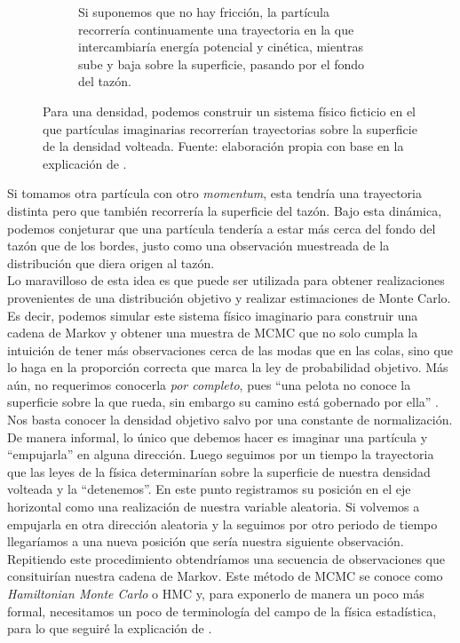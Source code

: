 \begin{figure}[h]
\begin{subfigure}{0.45\textwidth}
        \caption{Si suponemos que no hay fricción, la partícula recorrería continuamente una trayectoria en la que intercambiaría energía potencial y cinética, mientras sube y baja sobre la superficie, pasando por el fondo del tazón.}
        \label{fig:Part_Rodando_B}
    \end{subfigure}
	\caption{Para una densidad, podemos construir un sistema físico ficticio en el que partículas imaginarias recorrerían trayectorias sobre la superficie de la densidad volteada. Fuente: elaboración propia con base en la explicación de \textcite{Lambert18}.}
	\label{fig:Part_Rodando}	
\end{figure}
 
 Si tomamos otra partícula con otro \textit{momentum}, esta tendría una trayectoria distinta pero que también recorrería la superficie del tazón. Bajo esta dinámica, podemos conjeturar que una partícula tendería a estar más cerca del fondo del tazón que de los bordes, justo como una observación muestreada de la distribución que diera origen al tazón.\\ 
 
 Lo maravilloso de esta idea es que puede ser utilizada para obtener realizaciones provenientes de una distribución objetivo y realizar estimaciones de Monte Carlo. Es decir, podemos simular este sistema físico imaginario para construir una cadena de Markov y obtener una muestra de MCMC que no solo cumpla la intuición de tener más observaciones cerca de las modas que en las colas, sino que lo haga en la proporción correcta que marca la ley de probabilidad objetivo. Más aún, no requerimos conocerla \textit{por completo}, pues ``una pelota no conoce la superficie sobre la que rueda, sin embargo su camino está gobernado por ella'' \parencite{McElreath17}. Nos basta conocer la densidad objetivo salvo por una constante de normalización.\\ 
 
 De manera informal, lo único que debemos hacer es imaginar una partícula y ``empujarla'' en alguna dirección. Luego seguimos por un tiempo la trayectoria que las leyes de la física determinarían sobre la superficie de nuestra densidad volteada y la ``detenemos''. En este punto registramos su posición en el eje horizontal como una realización de nuestra variable aleatoria. Si volvemos a empujarla en otra dirección aleatoria y la seguimos por otro periodo de tiempo llegaríamos a una nueva posición que sería nuestra siguiente observación. Repitiendo este procedimiento obtendríamos una secuencia de observaciones que consituirían nuestra cadena de Markov. Este método de MCMC se conoce como \textit{Hamiltonian Monte Carlo} o HMC y, para exponerlo de manera un poco más formal, necesitamos un poco de terminología del campo de la física estadística, para lo que seguiré la explicación de \textcite{Neal93}.
 
